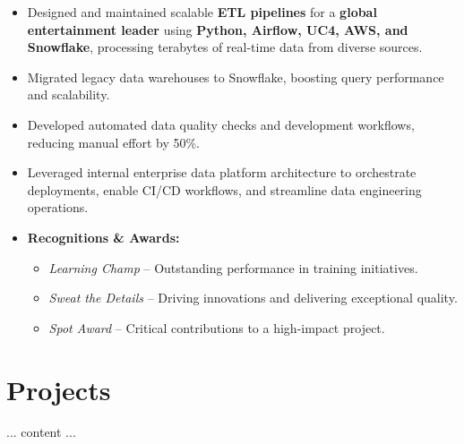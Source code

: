 \begin{itemize}[leftmargin=0.5cm]

    \item Designed and maintained scalable \textbf{ETL pipelines} for a \textbf{global entertainment leader} using \textbf{Python, Airflow, UC4, AWS, and Snowflake}, processing terabytes of real-time data from diverse sources.
    \item Migrated legacy data warehouses to Snowflake, boosting query performance and scalability.
    \item Developed automated data quality checks and development workflows, reducing manual effort by 50\%.
    \item Leveraged internal enterprise data platform architecture to orchestrate deployments, enable CI/CD workflows, and streamline data engineering operations.
    
    \item \textbf{Recognitions \& Awards:}
    \begin{itemize}[leftmargin=0.5cm]
        \item \textit{Learning Champ} – Outstanding performance in training initiatives.
        \item \textit{Sweat the Details} – Driving innovations and delivering exceptional quality.
        \item \textit{Spot Award} – Critical contributions to a high-impact project.
    \end{itemize}

\end{itemize}

\section*{Projects}
... content ...



